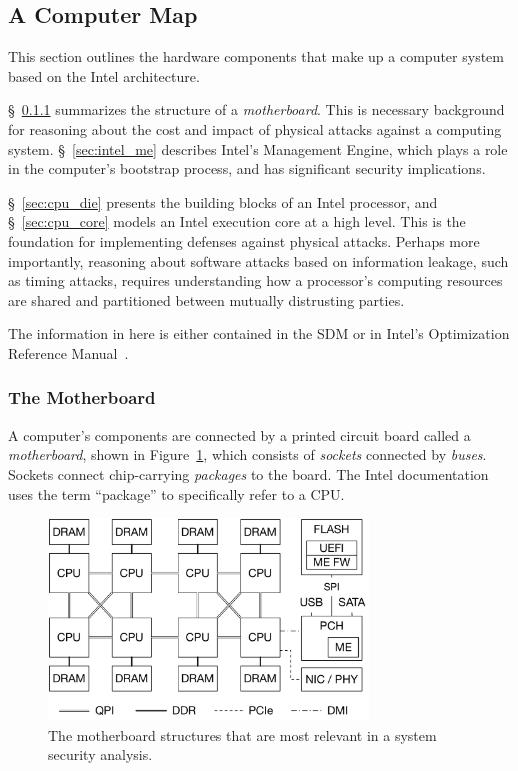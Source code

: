 \subsection{A Computer Map}
\label{sec:computer_map}


This section outlines the hardware components that make up a computer system
based on the Intel architecture.

\S~\ref{sec:motherboard} summarizes the structure of a \textit{motherboard}.
This is necessary background for reasoning about the cost and impact of
physical attacks against a computing system. \S~\ref{sec:intel_me} describes
Intel's Management Engine, which plays a role in the computer's bootstrap
process, and has significant security implications.

\S~\ref{sec:cpu_die} presents the building blocks of an Intel processor, and
\S~\ref{sec:cpu_core} models an Intel execution core at a high level. This is
the foundation for implementing defenses against physical attacks. Perhaps more
importantly, reasoning about software attacks based on information leakage,
such as timing attacks, requires understanding how a processor's computing
resources are shared and partitioned between mutually distrusting parties.

The information in here is either contained in the SDM or in Intel's
Optimization Reference Manual~\cite{intel2014optimization}.


\subsubsection{The Motherboard}
\label{sec:motherboard}

A computer's components are connected by a printed circuit board called a
\textit{motherboard}, shown in Figure~\ref{fig:motherboard}, which consists of
\textit{sockets} connected by \textit{buses}. Sockets connect chip-carrying
\textit{packages} to the board. The Intel documentation uses the term
``package'' to specifically refer to a CPU.

\begin{figure}[hbt]
  \centering
  \includegraphics[width=85mm]{figures/motherboard.pdf}
  \caption{
    The motherboard structures that are most relevant in a system security
    analysis.
  }
  \label{fig:motherboard}
\end{figure}

